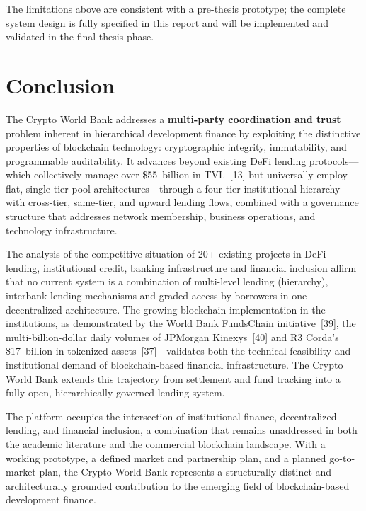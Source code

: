 \documentclass[12pt,a4paper]{report}
\begin{document}
The limitations above are consistent with a pre-thesis prototype; the complete system design is fully specified in this report and will be implemented and validated in the final thesis phase.


\chapter{Conclusion}

The Crypto World Bank addresses a \textbf{multi-party coordination and trust} problem inherent in hierarchical development finance by exploiting the distinctive properties of blockchain technology: cryptographic integrity, immutability, and programmable auditability. It advances beyond existing DeFi lending protocols---which collectively manage over \$55~billion in TVL~[13] but universally employ flat, single-tier pool architectures---through a four-tier institutional hierarchy with cross-tier, same-tier, and upward lending flows, combined with a governance structure that addresses network membership, business operations, and technology infrastructure.

The analysis of the competitive situation of 20+ existing projects in DeFi lending, institutional credit, banking infrastructure and financial inclusion affirm that no current system is a combination of multi-level lending (hierarchy), interbank lending mechanisms and graded access by borrowers in one decentralized architecture. The growing blockchain implementation in the institutions, as demonstrated by the World Bank FundsChain initiative~[39], the multi-billion-dollar daily volumes of JPMorgan Kinexys~[40] and R3 Corda's \$17~billion in tokenized assets~[37]---validates both the technical feasibility and institutional demand of blockchain-based financial infrastructure. The Crypto World Bank extends this trajectory from settlement and fund tracking into a fully open, hierarchically governed lending system.

The platform occupies the intersection of institutional finance, decentralized lending, and financial inclusion, a combination that remains unaddressed in both the academic literature and the commercial blockchain landscape. With a working prototype, a defined market and partnership plan, and a planned go-to-market plan, the Crypto World Bank represents a structurally distinct and architecturally grounded contribution to the emerging field of blockchain-based development finance.
\end{document}
